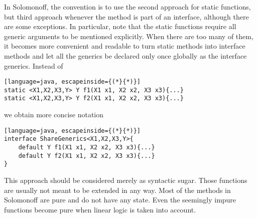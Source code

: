 In Solomonoff, the convention is to use the second approach for static functions, but third approach whenever the method is part of an interface, although there are some exceptions. In particular, note that the static functions require all generic arguments to be mentioned explicitly. When there are too many of them, it becomes more convenient and readable to turn static methods into interface methods and let all the generics be declared only once globally as the interface generics. Instead of
\begin{lstlisting}[language=java, escapeinside={(*}{*)}]
static <X1,X2,X3,Y> Y f1(X1 x1, X2 x2, X3 x3){...}
static <X1,X2,X3,Y> Y f2(X1 x1, X2 x2, X3 x3){...}
\end{lstlisting}
we obtain more concise notation
\begin{lstlisting}[language=java, escapeinside={(*}{*)}]
interface ShareGenerics<X1,X2,X3,Y>{
    default Y f1(X1 x1, X2 x2, X3 x3){...}
    default Y f2(X1 x1, X2 x2, X3 x3){...}
}
\end{lstlisting}
This approach should be considered merely as syntactic sugar. Those functions are usually not meant to be extended in any way. Most of the methods in Solomonoff are pure and do not have any state. Even the seemingly impure functions become pure when linear logic is taken into account. 






